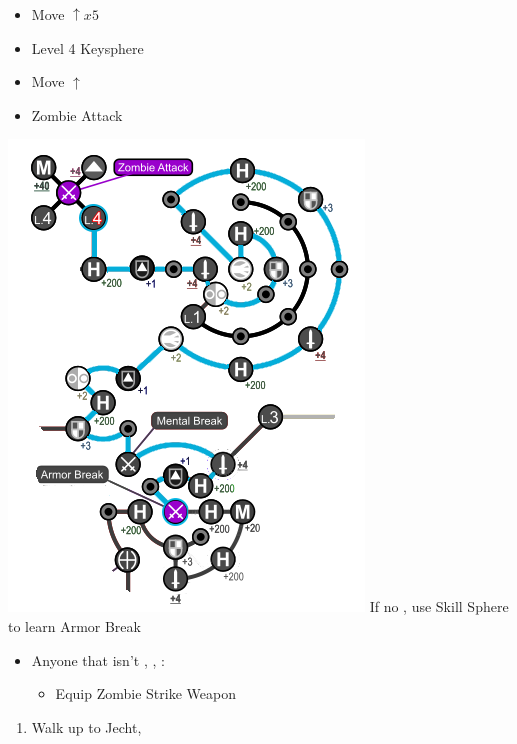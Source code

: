 \begin{spheregrid}
\begin{multicols}{2}
\begin{itemize}
\begin{itemize}
				            \begin{itemize}
					            \item Move $\uparrow x5$
					            \item Level 4 Keysphere
					            \item Move $\uparrow$
					            \item Zombie Attack
				            \end{itemize}
						\includegraphics[width=.8\columnwidth]{graphics/Tidus_BFA}
				            \rikkuf If no \od, use Skill Sphere to learn Armor Break
			      \end{itemize}
		\end{itemize}
	\end{multicols}
\end{spheregrid}
	\begin{equip}
		\begin{itemize}
			\item Anyone that isn't \tidus, \yuna, \auron:
			      \begin{itemize}
				      \item Equip Zombie Strike Weapon
			      \end{itemize}
		\end{itemize}
	\end{equip}
	\begin{enumerate}[resume]
		\item Walk up to Jecht, \cs[4:30]
	\end{enumerate}
	
